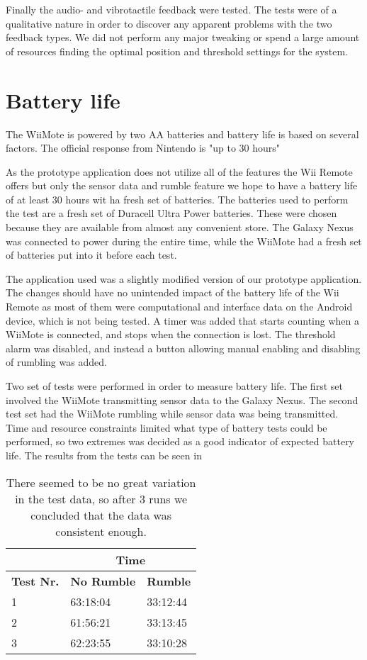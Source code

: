 Finally the audio- and vibrotactile feedback were tested. The tests were of a qualitative nature in order to discover any apparent problems with the two feedback types. We did not perform any major tweaking or spend a large amount of resources finding the optimal position and threshold settings for the system. 

\section{Battery life}
The WiiMote is powered by two AA batteries and battery life is based on several factors. The official response from Nintendo is "up to 30 hours" \cite{wiiBattery}

As the prototype application does not utilize all of the features the Wii Remote offers but only the sensor data and rumble feature we hope to have a battery life of at least 30 hours wit ha fresh set of batteries. The batteries used to perform the test are a fresh set of Duracell Ultra Power batteries. These were chosen because they are available from almost any convenient store. The Galaxy Nexus was connected to power during the entire time, while the WiiMote had a fresh set of batteries put into it before each test.

The application used was a slightly modified version of our prototype application. The changes should have no unintended impact of the battery life of the Wii Remote as most of them were computational and interface data on the Android device, which is not being tested. A timer was added that starts counting when a WiiMote is connected, and stops when the connection is lost. The threshold alarm was disabled, and instead a button allowing manual enabling and disabling of rumbling was added.

Two set of tests were performed in order to measure battery life. The first set involved the WiiMote transmitting sensor data to the Galaxy Nexus. The second test set had the WiiMote rumbling while sensor data was being transmitted. Time and resource constraints limited what type of battery tests could be performed, so two extremes was decided as a good indicator of expected battery life. The results from the tests can be seen in %

\begin{table}[h]
\centering
\setlength{\extrarowheight}{0,2cm}
\begin{tabular}{p{2cm}|p{4.75cm}|p{4.75cm}|}
\cline{2-3}
&\multicolumn{2}{c|}{\textbf{Time}}\\ \hline
\textbf{Test Nr.} &\textbf{No Rumble} & \textbf{Rumble} \\ \hline
1 & 63:18:04 & 33:12:44 \\ \hline
2 & 61:56:21 & 33:13:45 \\ \hline
3 & 62:23:55 & 33:10:28 \\ \hline
\end{tabular}
\caption{There seemed to be no great variation in the test data, so after 3 runs we concluded that the data was consistent enough.}
\label{}
\end{table}

